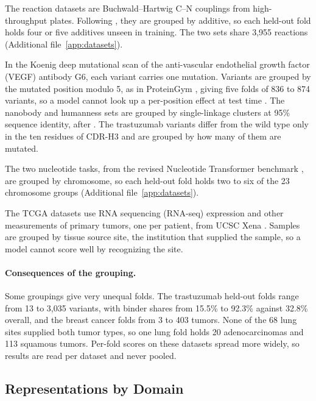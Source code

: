 The reaction datasets are Buchwald--Hartwig C--N couplings from high-throughput plates. Following \citet{Ahneman2018}, they are grouped by additive, so each held-out fold holds four or five additives unseen in training. The two sets share 3,955 reactions (Additional file~\ref{app:datasets}).

In the Koenig deep mutational scan of the anti-vascular endothelial growth factor (VEGF) antibody G6, each variant carries one mutation. Variants are grouped by the mutated position modulo 5, as in ProteinGym \citep{Notin2023}, giving five folds of 836 to 874 variants, so a model cannot look up a per-position effect at test time \citep{Vieira2026}. The nanobody and humanness sets are grouped by single-linkage clusters at 95\% sequence identity, after \citet{Kenlay2024}. The trastuzumab variants differ from the wild type only in the ten residues of CDR-H3 and are grouped by how many of them are mutated.

The two nucleotide tasks, from the revised Nucleotide Transformer benchmark \citep{DallaTorre2025}, are grouped by chromosome, so each held-out fold holds two to six of the 23 chromosome groups (Additional file~\ref{app:datasets}).

The TCGA datasets use RNA sequencing (RNA-seq) expression and other measurements of primary tumors, one per patient, from UCSC Xena \citep{Goldman2020}. Samples are grouped by tissue source site, the institution that supplied the sample, so a model cannot score well by recognizing the site.

\paragraph{Consequences of the grouping.} Some groupings give very unequal folds. The trastuzumab held-out folds range from 13 to 3,035 variants, with binder shares from 15.5\% to 92.3\% against 32.8\% overall, and the breast cancer folds from 3 to 403 tumors. None of the 68 lung sites supplied both tumor types, so one lung fold holds 20 adenocarcinomas and 113 squamous tumors. Per-fold scores on these datasets spread more widely, so results are read per dataset and never pooled.
\subsection{Representations by Domain}\label{sec:method:reps}

